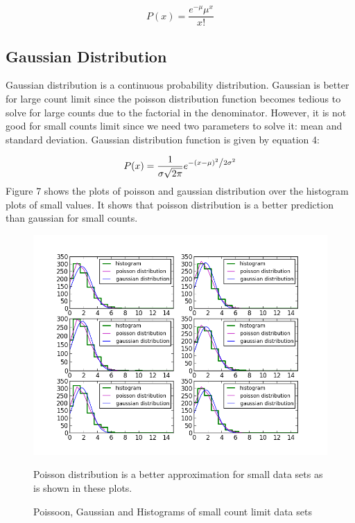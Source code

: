 \documentclass[letterpaper,12pt]{article}
\begin{document}
\begin{equation} \label{poisson} P\left( x \right) = \frac{{e^{ - \mu } \mu ^x }}{{x!}} \end{equation}

\subsection{Gaussian Distribution}
\label{sec:gaussian distribution}
Gaussian distribution is a continuous probability distribution. Gaussian is better for large count limit since the poisson distribution function becomes tedious to solve for large counts due to the factorial in the denominator. However, it is not good for small counts limit since we need two parameters to solve it: mean and standard deviation.
Gaussian distribution function is given by equation 4:

\begin{equation}
\label{gaussian}
P(x) = \frac{1}{{\sigma \sqrt {2\pi } }}e^{{{ - \left( {x - \mu } \right)^2 } \mathord{\left/ {\vphantom {{ - \left( {x - \mu } \right)^2 } {2\sigma ^2 }}} \right. \kern-\nulldelimiterspace} {2\sigma ^2 }}}
\end{equation}
Figure 7 shows the plots of poisson and gaussian distribution over the histogram plots of small values. It shows that poisson distribution is a better prediction than gaussian for small counts.

\begin{figure}
\centering
\includegraphics[scale=0.9]{poisson-gaussian-histograms-8.png}
\caption{Poissoon, Gaussian and Histograms of small count limit data sets}
Poisson distribution is a better approximation for small data sets as is shown in these plots.\end{figure}
\end{document}
